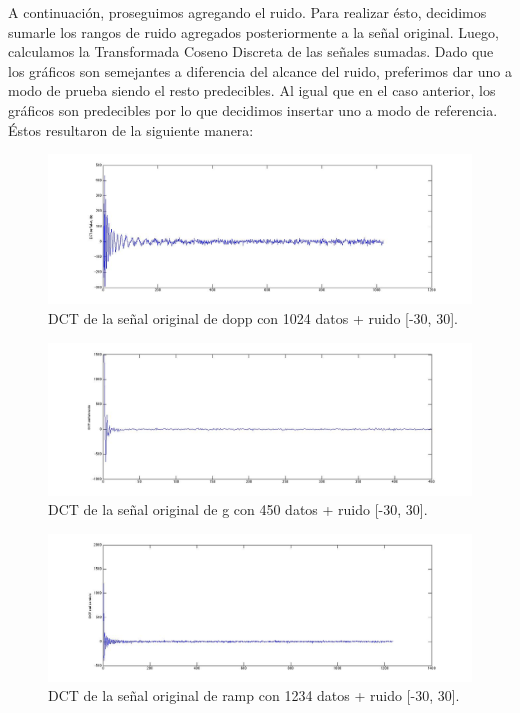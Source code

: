 \documentclass[10pt, a4paper]{article}
\begin{document}
\begin{itemize}
A continuación, proseguimos agregando el ruido. Para realizar ésto, decidimos sumarle los rangos de ruido agregados posteriormente a la señal original. Luego, calculamos la Transformada Coseno Discreta de las señales sumadas. Dado que los gráficos son semejantes a diferencia del alcance del ruido, preferimos dar uno a modo de prueba siendo el resto predecibles. Al igual que en el caso anterior, los gráficos son predecibles por lo que decidimos insertar uno a modo de referencia. Éstos resultaron de la siguiente manera:

\begin{figure}[H] %
\begin{center}
\includegraphics[width=500pt]{./dopp1024_union.jpg}
\caption[h]{DCT de la señal original de dopp con 1024 datos + ruido [-30, 30].}
\end{center}
\end{figure}

\begin{figure}[H] %
\begin{center}
\includegraphics[width=500pt]{./g450_union.jpg}
\caption[h]{DCT de la señal original de g con 450 datos + ruido [-30, 30].}
\end{center}
\end{figure}

\begin{figure}[H] %
\begin{center}
\includegraphics[width=500pt]{./ramp1234_union.jpg}
\caption[h]{DCT de la señal original de ramp con 1234 datos + ruido [-30, 30].}
\end{center}
\end{figure}


\end{itemize}
\end{document}
